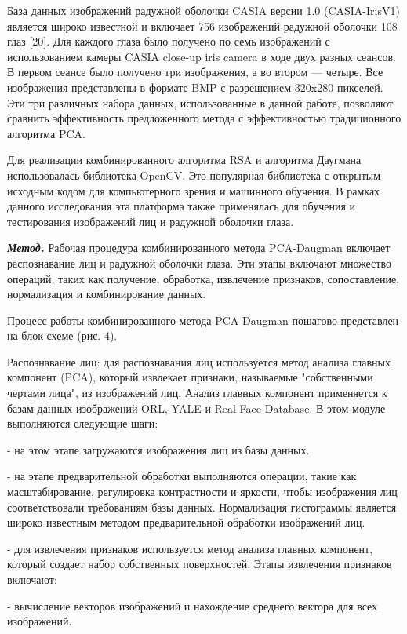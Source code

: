 \begin{multicols}{2}
База данных изображений радужной оболочки CASIA версии 1.0
(CASIA-IrisV1) является широко известной и включает 756 изображений
радужной оболочки 108 глаз {[}20{]}. Для каждого глаза было получено по
семь изображений с использованием камеры CASIA close-up iris camera в
ходе двух разных сеансов. В первом сеансе было получено три изображения,
а во втором --- четыре. Все изображения представлены в формате BMP с
разрешением 320x280 пикселей. Эти три различных набора данных,
использованные в данной работе, позволяют сравнить эффективность
предложенного метода с эффективностью традиционного алгоритма PCA.

Для реализации комбинированного алгоритма RSA и алгоритма Даугмана
использовалась библиотека OpenCV. Это популярная библиотека с открытым
исходным кодом для компьютерного зрения и машинного обучения. В рамках
данного исследования эта платформа также применялась для обучения и
тестирования изображений лиц и радужной оболочки глаза.

\emph{{\bfseries Метод.}} Рабочая процедура комбинированного метода
PCA-Daugman включает распознавание лиц и радужной оболочки глаза. Эти
этапы включают множество операций, таких как получение, обработка,
извлечение признаков, сопоставление, нормализация и комбинирование
данных.

Процесс работы комбинированного метода PCA-Daugman пошагово представлен
на блок-схеме (рис. 4).

Распознавание лиц: для распознавания лиц используется метод анализа
главных компонент (PCA), который извлекает признаки, называемые
"собственными чертами лица", из изображений лиц. Анализ главных
компонент применяется к базам данных изображений ORL, YALE и Real Face
Database. В этом модуле выполняются следующие шаги:

- на этом этапе загружаются изображения лиц из базы данных.

- на этапе предварительной обработки выполняются операции, такие как
масштабирование, регулировка контрастности и яркости, чтобы изображения
лиц соответствовали требованиям базы данных. Нормализация гистограммы
является широко известным методом предварительной обработки изображений
лиц.

- для извлечения признаков используется метод анализа главных компонент,
который создает набор собственных поверхностей. Этапы извлечения
признаков включают:

- вычисление векторов изображений и нахождение среднего вектора для всех
изображений.
\end{multicols}

